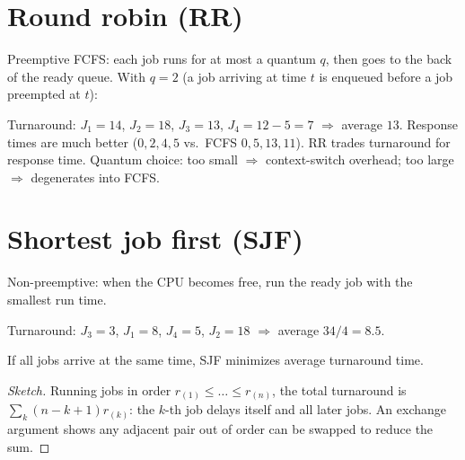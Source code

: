 \section{Round robin (RR)}

Preemptive FCFS: each job runs for at most a quantum $q$, then goes to the back of the ready
queue. With $q=2$ (a job arriving at time $t$ is enqueued before a job preempted at $t$):

\begin{center}
\end{center}
Turnaround: $J_1 = 14$, $J_2 = 18$, $J_3 = 13$, $J_4 = 12-5 = 7$ $\Rightarrow$ average $13$.
Response times are much better ($0, 2, 4, 5$ vs.\ FCFS $0,5,13,11$). RR trades turnaround for
response time. Quantum choice: too small $\Rightarrow$ context-switch overhead; too large
$\Rightarrow$ degenerates into FCFS.

\section{Shortest job first (SJF)}

Non-preemptive: when the CPU becomes free, run the ready job with the smallest run time.

\begin{center}
\end{center}
Turnaround: $J_3=3$, $J_1=8$, $J_4=5$, $J_2=18$ $\Rightarrow$ average $34/4 = 8.5$.

\begin{theorem}
If all jobs arrive at the same time, SJF minimizes average turnaround time.
\end{theorem}
\begin{proof}[Sketch]
Running jobs in order $r_{(1)} \le \dots \le r_{(n)}$, the total turnaround is
$\sum_k (n-k+1) r_{(k)}$: the $k$-th job delays itself and all later jobs. An exchange argument
shows any adjacent pair out of order can be swapped to reduce the sum.
\end{proof}

